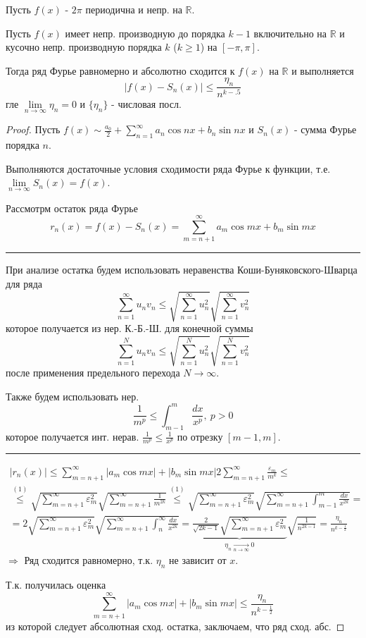 \documentclass{article}
\newcommand\hr{
    \noindent\rule[0.5ex]{\linewidth}{0.5pt}
}
\theoremstyle{definition}
\numberwithin{theorem}{section}
\numberwithin{lemma}{section}
\numberwithin{definition}{section}
\numberwithin{corollary}{section}
\numberwithin{equation}{section}
\let\epsilon\varepsilon
\let\implies\Rightarrow
\newcommand\R{\ensuremath{\mathbb{R}}}
\begin{document}
\begin{theorem}
  Пусть $f(x)$ - $2\pi$ периодична и непр. на $\R$.

  Пусть $f(x)$ имеет непр. производную до порядка $k-1$ включительно на $\R$
  и кусочно непр. производную порядка $k$ ($k\ge 1$) на $[-\pi,\pi]$.
  
  Тогда ряд Фурье равномерно и абсолютно сходится к $f(x)$ на $\R$
  и выполняется 
  \[
    |f(x)-S_n(x)| \le \frac{\eta_n}{n^{k-.5}}
  \]
  гле $\lim \limits_{n\to \infty} \eta_n =0$ и $\{\eta_n\}$ - числовая посл.
\end{theorem}
\begin{proof}
  Пусть $f(x) \sim \frac{a_0}{2}+\sum_{n=1}^{\infty}a_n\cos nx + b_n \sin nx$
  и $S_n(x)$ - сумма Фурье порядка $n$.

  Выполняются достаточные условия сходимости ряда Фурье к функции,
  т.е. $\lim \limits_{n\to \infty} S_n(x)=f(x)$.

  Рассмотрм остаток ряда Фурье
  \[
    r_n(x)=f(x)-S_n(x)=\sum_{m=n+1}^{\infty}a_m\cos mx + b_m \sin mx
  \]
  \hr
  При анализе остатка будем использовать неравенства Коши-Буняковского-Шварца
  для ряда
  \[
    \sum_{n=1}^{\infty}u_nv_n \le \sqrt{\sum_{n=1}^{\infty}u_n^{2}}\sqrt{\sum_{n=1}^{\infty}v_n^{2}} \tag{$1$}
  \]
  которое получается из нер. К.-Б.-Ш. для конечной суммы
  \[
    \sum_{n=1}^{N}u_nv_n \le \sqrt{\sum_{n=1}^{N}u_n^{2}}\sqrt{\sum_{n=1}^{N}v_n^{2}}
  \]
  после применения предельного перехода $N\to\infty$.

  Также будем использовать нер.
  \[
    \frac{1}{m^{p}} \le \int_{m-1}^{m}\frac{dx}{x^{p}}, \ p>0 \tag{$2$}
  \]
  которое получается инт. нерав. $\frac{1}{m^{p}}\le \frac{1}{x^{p}}$
  по отрезку $[m-1,m]$.

  \hr
  \begin{gather*}
    |r_n(x)| \le \sum_{m=n+1}^{\infty}|a_m \cos mx| +|b_m\sin mx|
    2\sum_{m=n+1}^{\infty}\frac{\epsilon_m}{m^{k}} \le \\
    \overset{(1)}{\le} \sqrt{\sum_{m=n+1}^{\infty}\epsilon_m^{2}}\sqrt{\sum_{m=n+1}^{\infty}\frac{1}{m^{2k}}}
    \overset{(1)}{\le} \sqrt{\sum_{m=n+1}^{\infty}\epsilon_m^{2}}\sqrt{\sum_{m=n+1}^{\infty}\int_{m-1}^{m}\frac{dx}{x^{2k}}} = \\
    = 2\sqrt{\sum_{m=n+1}^{\infty}\epsilon_m^{2}}\sqrt{\sum_{m=n+1}^{\infty}\int_{n}^{\infty}\frac{dx}{x^{2k}}}
    = \underbrace{\frac{2}{\sqrt{2k-1}}\sqrt{\sum_{m=n+1}^{\infty}\epsilon_m^{2}}}_{\eta_n \underset{n\to\infty}{\to}0}\sqrt{\frac{1}{n^{2k-1}}}
    = \frac{\eta_n}{n^{k-\frac{1}{2}}}
  \end{gather*}
  $\implies$ Ряд сходится равномерно, т.к. $\eta_n$ не зависит от $x$.

  Т.к. получилась оценка
  \[
    \sum_{m=n+1}^{\infty}|a_m\cos mx| + |b_m\sin mx| \le \frac{\eta_n}{n^{k-\frac{1}{2}}}
  \]
  из которой следует абсолютная сход. остатка, заключаем, что ряд сход. абс.
\end{proof}
\end{document}
